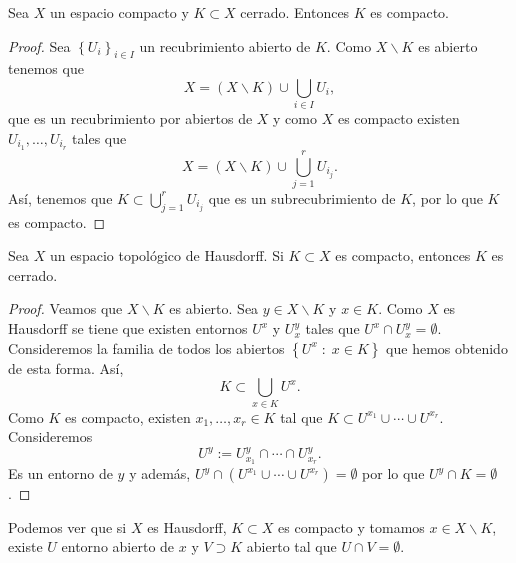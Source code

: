 \begin{prop}
Sea $\displaystyle X $ un espacio compacto y $\displaystyle K\subset X $ cerrado. Entonces $\displaystyle K $ es compacto. 
\end{prop}
\begin{proof}
	Sea $\displaystyle \left\{ U_{i}\right\} _{i \in I} $ un recubrimiento abierto de $\displaystyle K $. Como $\displaystyle X \backslash K $ es abierto tenemos que 
	\[X = \left(X \backslash K\right)\cup \bigcup_{i \in I}U_{i} ,\]
	que es un recubrimiento por abiertos de $\displaystyle X $ y como $\displaystyle X $ es compacto existen $\displaystyle U_{i_{1}}, \ldots, U_{i_{r}} $ tales que 
	\[X = \left(X \backslash K\right)\cup \bigcup_{j = 1}^{r}U_{i_{j}} .\]
Así, tenemos que $\displaystyle K \subset \bigcup_{j = 1}^{r}U_{i_{j}} $ que es un subrecubrimiento de $\displaystyle K $, por lo que $\displaystyle K $ es compacto.	
\end{proof}
\begin{prop}
Sea $\displaystyle X $ un espacio topológico de Hausdorff. Si $\displaystyle K \subset X $ es compacto, entonces $\displaystyle K $ es cerrado.
\end{prop}
\begin{proof}
	Veamos que $\displaystyle X \backslash K $ es abierto. Sea $\displaystyle y \in X \backslash K $ y $\displaystyle x \in K $. Como $\displaystyle X $ es Hausdorff se tiene que existen entornos $\displaystyle U^{x} $ y $\displaystyle U^{y}_{x} $ tales que $\displaystyle U^{x} \cap U^{y}_{x}= \emptyset $. Consideremos la familia de todos los abiertos $\displaystyle \left\{ U^{x} \; : \; x \in K\right\}  $ que hemos obtenido de esta forma. Así, 
	\[K \subset \bigcup_{x \in K}U^{x} .\]
	Como $\displaystyle K $ es compacto, existen $\displaystyle x_{1}, \ldots, x_{r}\in K $ tal que $\displaystyle K \subset U^{x_{1}} \cup \cdots \cup U^{x_{r}} $. Consideremos 
	\[U^{y} := U^{y}_{x_{1}}\cap \cdots \cap U^{y}_{x_{r}} .\]
	Es un entorno de $\displaystyle y $ y además, $\displaystyle U^{y} \cap \left(U^{x_{1}} \cup \cdots \cup U^{x_{r}}\right)= \emptyset $ por lo que $\displaystyle U^{y} \cap K = \emptyset $.
\end{proof}
\begin{observation}
Podemos ver que si $\displaystyle X $ es Hausdorff, $\displaystyle K\subset X $ es compacto y tomamos $\displaystyle x \in X \backslash K $, existe $\displaystyle U $ entorno abierto de $\displaystyle x $ y $\displaystyle V \supset K $ abierto tal que $\displaystyle U \cap V = \emptyset$. 
\end{observation}
